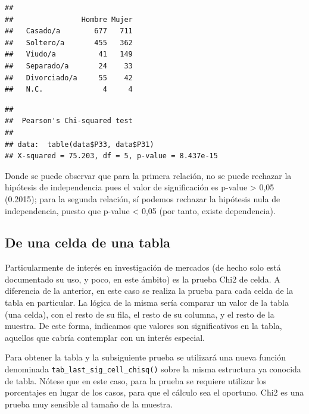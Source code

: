 \documentclass[
]{book}
\newenvironment{Shaded}{\begin{snugshade}}{\end{snugshade}}
\newcommand{\FunctionTok}[1]{\textcolor[rgb]{0.00,0.00,0.00}{#1}}
\newcommand{\NormalTok}[1]{#1}
\newcommand{\SpecialCharTok}[1]{\textcolor[rgb]{0.00,0.00,0.00}{#1}}
\begin{document}
\begin{verbatim}
##               
##                Hombre Mujer
##   Casado/a        677   711
##   Soltero/a       455   362
##   Viudo/a          41   149
##   Separado/a       24    33
##   Divorciado/a     55    42
##   N.C.              4     4
\end{verbatim}

\begin{Shaded}
\end{Shaded}

\begin{verbatim}
## 
##  Pearson's Chi-squared test
## 
## data:  table(data$P33, data$P31)
## X-squared = 75.203, df = 5, p-value = 8.437e-15
\end{verbatim}

Donde se puede observar que para la primera relación, no se puede rechazar la hipótesis de independencia pues el valor de significación es p-value \textgreater{} 0,05 (0.2015); para la segunda relación, sí podemos rechazar la hipótesis nula de independencia, puesto que p-value \textless{} 0,05 (por tanto, existe dependencia).

\hypertarget{de-una-celda-de-una-tabla}{%
\subsection{De una celda de una tabla}\label{de-una-celda-de-una-tabla}}

Particularmente de interés en investigación de mercados (de hecho solo está documentado su uso, y poco, en este ámbito) es la prueba Chi2 de celda. A diferencia de la anterior, en este caso se realiza la prueba para cada celda de la tabla en particular. La lógica de la misma sería comparar un valor de la tabla (una celda), con el resto de su fila, el resto de su columna, y el resto de la muestra. De este forma, indicamos que valores son significativos en la tabla, aquellos que cabría contemplar con un interés especial.

Para obtener la tabla y la subsiguiente prueba se utilizará una nueva función denominada \texttt{tab\_last\_sig\_cell\_chisq()} sobre la misma estructura ya conocida de tabla. Nótese que en este caso, para la prueba se requiere utilizar los porcentajes en lugar de los casos, para que el cálculo sea el oportuno. Chi2 es una prueba muy sensible al tamaño de la muestra.
\end{document}
